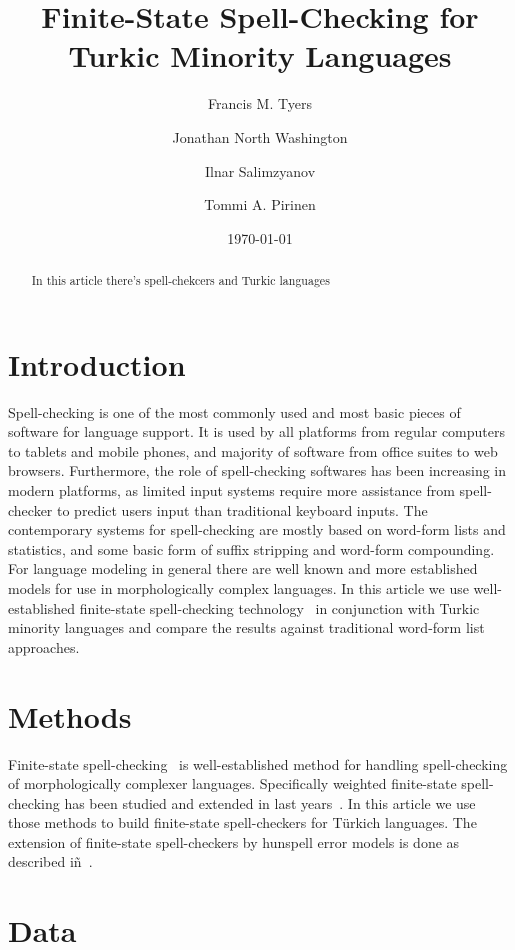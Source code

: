 \documentclass[a5paper]{article}
\title{Finite-State Spell-Checking for Turkic Minority Languages}
\author{Francis M. Tyers \and Jonathan North Washington \and Ilnar Salimzyanov \and Tommi A. Pirinen}
\date{\today}
\begin{document}
\maketitle

\begin{abstract}
    In this article there's spell-chekcers and Turkic languages
\end{abstract}

\section{Introduction}
\label{sec:introduction}

Spell-checking is one of the most commonly used and most basic pieces of
software for language support. It is used by all platforms from regular
computers to tablets and mobile phones, and majority of software from office
suites to web browsers. Furthermore, the role of spell-checking softwares has
been increasing in modern platforms, as limited input systems require more
assistance from spell-checker to predict users input than traditional keyboard
inputs. The contemporary systems for spell-checking are mostly based on
word-form lists and statistics, and some basic form of suffix stripping and
word-form compounding. For language modeling in general there are well known
and more established models for use in morphologically complex languages. In
this article we use well-established finite-state spell-checking
technology~\cite{pirinen2012compiling} in conjunction with Turkic minority
languages and compare the results against traditional word-form list
approaches.

\section{Methods}

Finite-state spell-checking~\cite{agata2002typographical} is well-established
method for handling spell-checking of morphologically complexer languages.
Specifically weighted finite-state spell-checking has been studied and extended
in last years~\cite{pirinen2010finitestate}. In this article we use those
methods to build finite-state spell-checkers for Türkich languages. The
extension of finite-state spell-checkers by hunspell error models is done
as described iñ~\cite{pirinen2010building}.

\section{Data}
\end{document}
